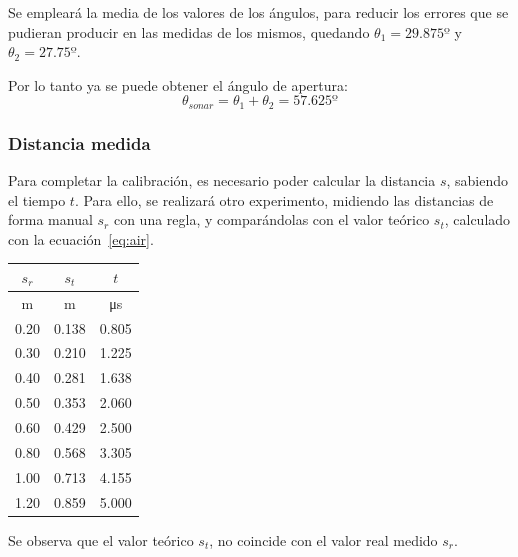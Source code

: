 \documentclass[10pt,a4paper,hidelinks]{article}
\begin{document}
\begin{multicols}{2}
Se empleará la media de los valores de los ángulos, para reducir los errores que
se pudieran producir en las medidas de los mismos, quedando $\theta_1 = 29.875
º$ y $\theta_2 = 27.75 º$.

Por lo tanto ya se puede obtener el ángulo de apertura:
$$\theta_{sonar} = \theta_1 + \theta_2 = 57.625 º $$

\subsubsection{Distancia medida}

Para completar la calibración, es necesario poder calcular la distancia $s$,
sabiendo el tiempo $t$. Para ello, se realizará otro experimento, midiendo las
distancias de forma manual $s_r$ con una regla, y comparándolas con el valor
teórico $s_t$, calculado con la ecuación~\ref{eq:air}.

\begin{center}
\begin{tabular}{ | c | c | c | }
\hline
$s_{r}$ & $s_{t}$ & $t$ \\ \hline
m & m & \si{\micro\second} \\ \hline \hline
0.20 & 0.138 & 0.805 \\ \hline
0.30 & 0.210 & 1.225 \\ \hline
0.40 & 0.281 & 1.638 \\ \hline
0.50 & 0.353 & 2.060 \\ \hline
0.60 & 0.429 & 2.500 \\ \hline
0.80 & 0.568 & 3.305 \\ \hline
1.00 & 0.713 & 4.155 \\ \hline
1.20 & 0.859 & 5.000 \\ \hline
\end{tabular}
\end{center}

Se observa que el valor teórico $s_t$, no coincide con el valor real medido 
$s_r$.


\end{multicols}
\end{document}
